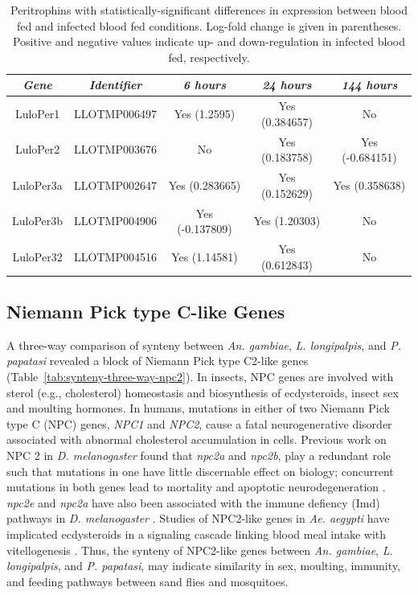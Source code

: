 \begin{table}[H]
  \centering
  \begin{tabular}{ c c c c c } \hline
    \emph{Gene} & \emph{Identifier} & \emph{6 hours} & \emph{24 hours} & \emph{144 hours} \\ \hline
    LuloPer1 & LLOTMP006497 & Yes (1.2595) & Yes (0.384657) & No \\
    LuloPer2 & LLOTMP003676 & No & Yes (0.183758) & Yes (-0.684151) \\
    LuloPer3a & LLOTMP002647 & Yes (0.283665) & Yes (0.152629) & Yes (0.358638) \\
    LuloPer3b & LLOTMP004906 & Yes (-0.137809) & Yes (1.20303) & No \\
    LuloPer32 & LLOTMP004516 & Yes (1.14581) & Yes (0.612843) & No
  \end{tabular}
  \caption{Peritrophins with statistically-significant differences in expression between blood fed and infected blood fed conditions. Log-fold change is given in parentheses. Positive and negative values indicate up- and down-regulation in infected blood fed, respectively.}
  \label{tab:sandflies:stat-sig-peritrophins-bi}
\end{table}

\subsection{Niemann Pick type C-like Genes}
A three-way comparison of synteny between \emph{An. gambiae}, \emph{L. longipalpis}, and \emph{P. papatasi} revealed a block of Niemann Pick type C2-like genes (Table~\ref{tab:synteny-three-way-npc2}). In insects, NPC genes are involved with sterol (e.g., cholesterol) homeostasis and biosynthesis of ecdysteroids, insect sex and moulting hormones. In humans, mutations in either of two Niemann Pick type C (NPC) genes, \emph{NPC1} and \emph{NPC2}, cause a fatal neurogenerative disorder associated with abnormal cholesterol accumulation in cells.  Previous work on NPC 2 in \emph{D. melanogaster} found that \emph{npc2a} and \emph{npc2b}, play a redundant role such that mutations in one have little discernable effect on biology; concurrent mutations in both genes lead to mortality and apoptotic neurodegeneration \cite{Huang2007}.  \emph{npc2e} and \emph{npc2a} have also been associated with the immune defiency (Imd) pathways in \emph{D. melanogaster} \cite{Shi2012}. Studies of NPC2-like genes in \emph{Ae. aegypti} have implicated ecdysteroids in a signaling cascade linking blood meal intake with vitellogenesis \cite{Sirot2011}.  Thus, the synteny of NPC2-like genes between \emph{An. gambiae}, \emph{L. longipalpis}, and \emph{P. papatasi}, may indicate similarity in sex, moulting, immunity, and feeding pathways between sand flies and mosquitoes.

